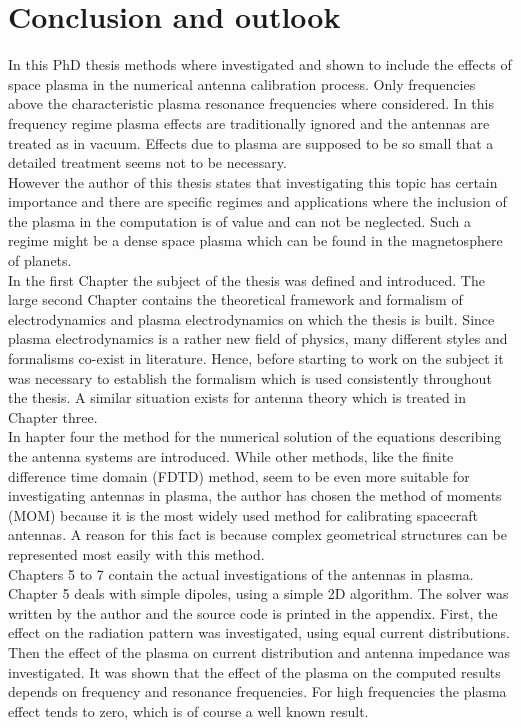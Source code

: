 \documentclass[a4paper,11pt]{thesis}
\begin{document}
\chapter{Conclusion and outlook}
In this PhD thesis methods where investigated and shown to include the effects of space plasma in the numerical antenna calibration process. Only
frequencies above the characteristic plasma resonance frequencies where considered. In this frequency regime plasma effects are traditionally
ignored and the antennas are treated as in vacuum. Effects due to plasma are supposed to be so small that a detailed treatment seems not
to be necessary.\\

However the author of this thesis states that investigating this topic has certain importance and there are specific regimes and applications where the inclusion of the plasma in the computation is of value and can not be neglected. Such a regime
might be a dense space plasma which can be found in the magnetosphere of planets.\\

In the first Chapter the subject of the thesis was defined and introduced. The large second Chapter contains the theoretical framework and
formalism of electrodynamics and plasma electrodynamics on which the thesis is built. Since plasma electrodynamics is a rather new field of physics, many different styles and formalisms
co-exist in literature. Hence, before starting to work on the subject it was necessary to establish the formalism which is used consistently
throughout the thesis. A similar situation exists for antenna theory which is treated in Chapter three.\\

In hapter four the method for the numerical solution of the equations describing the antenna systems are introduced. While other methods,
like the finite difference time domain (FDTD) method, seem to be even more suitable for investigating antennas in plasma, the author has chosen the
method of moments (MOM) because it is the most widely used method for calibrating spacecraft antennas. A reason for this fact is because
complex geometrical structures can be represented most easily with this method.\\

Chapters 5 to 7 contain the actual investigations of the antennas in plasma. Chapter 5 deals with simple dipoles, using a simple 2D algorithm.
The solver was written by the author and the source code is printed in the appendix. First, the effect on the radiation pattern was
investigated, using equal current distributions. Then the effect of the plasma on current distribution and antenna impedance was investigated.
It was shown that the effect of the plasma on the computed results depends on frequency and resonance frequencies. For high frequencies the
plasma effect tends to zero, which is of course a well known result.\\
\end{document}
